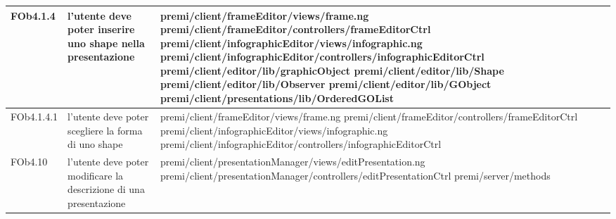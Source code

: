 \begin{longtable}{|l|p{5cm}|p{7cm}|}
FOb4.1.4 & l'utente deve poter inserire uno shape nella presentazione & \hspace{0pt}premi/client/frameEditor/views/frame.ng \linebreak \linebreak premi/client/frameEditor/controllers/frameEditorCtrl \linebreak \linebreak premi/client/infographicEditor/views/infographic.ng \linebreak \linebreak premi/client/infographicEditor/controllers/infographicEditorCtrl \linebreak \linebreak premi/client/editor/lib/graphicObject \linebreak \linebreak premi/client/editor/lib/Shape  \linebreak \linebreak \linebreak \linebreak premi/client/editor/lib/Observer premi/client/editor/lib/GObject \linebreak \linebreak premi/client/presentations/lib/OrderedGOList \\
\hline
FOb4.1.4.1 & l'utente deve poter scegliere la forma di uno shape & \hspace{0pt}premi/client/frameEditor/views/frame.ng \linebreak \linebreak premi/client/frameEditor/controllers/frameEditorCtrl \linebreak \linebreak premi/client/infographicEditor/views/infographic.ng \linebreak \linebreak premi/client/infographicEditor/controllers/infographicEditorCtrl \\
\hline
FOb4.10 & l'utente deve poter modificare la descrizione di una presentazione &\hspace{0pt}premi/client/presentationManager/views/editPresentation.ng \linebreak \linebreak premi/client/presentationManager/controllers/editPresentationCtrl  \linebreak \linebreak premi/server/methods \\
\hline

\end{longtable}
